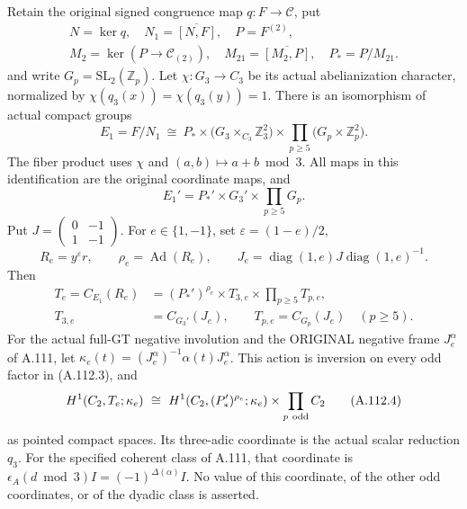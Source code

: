 Retain the original signed congruence map \(q:F\to\mathcal C\), put
\[
 \begin{gathered}
 N=\ker q,\quad N_1=\overline{[N,F]},\quad P=F^{(2)},\\
 M_2=\ker(P\to\mathcal C_{(2)}),\quad
 M_{21}=\overline{[M_2,P]},\quad P_*=P/M_{21}.
 \end{gathered}
\]
and write \(G_p=\mathrm{SL}_2(\mathbb Z_p)\).
Let \(\chi:G_3\to C_3\) be its actual abelianization character,
normalized by \(\chi(q_3(x))=\chi(q_3(y))=1\).
There is an isomorphism of actual compact groups
\[
 E_1=F/N_1\ \cong\
 P_*\times\bigl(G_3\times_{C_3}\mathbb Z_3^2\bigr)
       \times\prod_{p\geq5}\bigl(G_p\times\mathbb Z_p^2\bigr).
 \tag{A.112.1}
\]
The fiber product uses \(\chi\) and \((a,b)\mapsto a+b\bmod3\).
All maps in this identification are the original coordinate maps, and
\[
 E_1'=P_*'\times G_3'\times\prod_{p\geq5}G_p.
 \tag{A.112.2}
\]
Put \(J=\left(\begin{smallmatrix}0&-1\\1&-1\end{smallmatrix}\right)\).
For \(e\in\{1,-1\}\), set \(\varepsilon=(1-e)/2\),
\[
 R_e=y^\varepsilon r,\qquad \rho_e=\operatorname{Ad}(R_e),\qquad
 J_e=\operatorname{diag}(1,e)J\operatorname{diag}(1,e)^{-1}.
\]
Then
\[
 \begin{split}
 T_e=C_{E_1}(R_e)
   &=(P_*')^{\rho_e}\times T_{3,e}\times\prod_{p\geq5}T_{p,e},\\
 T_{3,e}&=C_{G_3'}(J_e),\qquad T_{p,e}=C_{G_p}(J_e)\quad(p\geq5).
 \end{split}
 \tag{A.112.3}
\]
For the actual full-GT negative involution and the ORIGINAL negative
frame \(J_e^\alpha\) of A.111, let
\(\kappa_e(t)=(J_e^\alpha)^{-1}\alpha(t)J_e^\alpha\).
This action is inversion on every odd factor in (A.112.3), and
\[
 H^1(C_2,T_e;\kappa_e)\ \cong\
 H^1(C_2,(P_*')^{\rho_e};\kappa_e)\times
                  \prod_{p\ {\rm odd}}C_2
 \tag{A.112.4}
\]
as pointed compact spaces. Its three-adic coordinate is the actual
scalar reduction \(q_3\). For the specified coherent class of A.111,
that coordinate is
\(\epsilon_A(d\bmod3)I=(-1)^{\Delta(\alpha)}I\).
No value of this coordinate, of the other odd coordinates, or of the
dyadic class is asserted.

